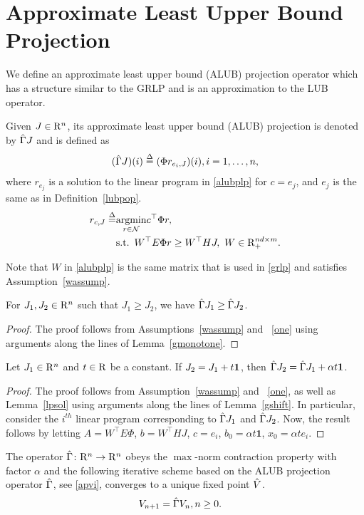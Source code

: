 \section{Approximate Least Upper Bound Projection}\label{sec:alubp}
We define an approximate least upper bound (ALUB) projection operator which has a structure similar to the GRLP and is an approximation to the LUB operator.
\begin{definition}\label{alubpop}
Given $J\in \mathrm{R}^n$, its approximate least upper bound (ALUB) projection is denoted by $\hat{\Gamma} J$ and is defined as 
\begin{align}\label{tgamdef}
(\hg J)(i)\stackrel{\Delta}{=}(\Phi r_{e_i,J})(i), \mb i=1,\ldots,n,
\end{align}
where $r_{e_j}$ is a solution to the linear program in \eqref{alubplp} for $c=e_j$, and $e_j$ is the same as in Definition~\ref{lubpop}.
\begin{align}\label{alubplp}
r_{c,J}\stackrel{\Delta}{=} & \underset{r\in \N}{\argmin}\mb c^\top \Phi r,\nn\\
& \text{s.t.}\,\,\, W^\top E \Phi r\geq W^\top HJ,\,\, W \in \R^{nd\times m}_+ .
\end{align}
\end{definition}
Note that $W$ in \eqref{alubplp} is the same matrix that is used in \eqref{grlp} and satisfies Assumption~\ref{wassump}.
\begin{lemma}\label{tgmonotone}
For $J_1, J_2\in \mathrm{R}^n$ such that $J_1\geq J_2$, we have $\hat{\Gamma} J_1\geq \hat{\Gamma} J_2$.
\end{lemma}
\begin{proof}
The proof follows from Assumptions~\ref{wassump} and ~\ref{one} using arguments along the lines of Lemma~\ref{gmonotone}.
\end{proof}
\begin{lemma}\label{tgshift}
Let $J_1\in \mathrm{R}^n$ and $t\in \mathrm{R}$ be a constant. If $J_2=J_1+t\mathbf{1}$, then $\hat{\Gamma} J_2=\hat{\Gamma} J_1+\alpha t\mathbf{1}$.
\end{lemma}
\begin{proof}
The proof follows from Assumption~\ref{wassump} and ~\ref{one}, as well as Lemma~\ref{lpsol} using arguments along the lines of Lemma~\ref{gshift}. In particular, consider the $i^{th}$ linear program corresponding to $\hat{\Gamma} J_1$ and $\hat{\Gamma} J_2$. Now, the result follows by letting $A=W^\top E \Phi$, $b=W^\top H J$, $c=e_i$, $b_0=\alpha t \mathbf{1}$, $x_0=\alpha t e_i$.
\end{proof}
\begin{theorem}\label{tgmaxcontra}
The operator $\hat{\Gamma} \colon \mathrm{R}^n\rightarrow \mathrm{R}^n$ obeys the $\max$-norm contraction property with factor $\alpha$ and the following iterative scheme based on the ALUB projection operator $\hat{\Gamma}$, see \eqref{apvi}, converges to a unique fixed point $\hat{V}$.
\begin{align}\label{apvi}
V_{n+1}&=\hg V_n,\mb n\geq 0.
\end{align}
\end{theorem}
